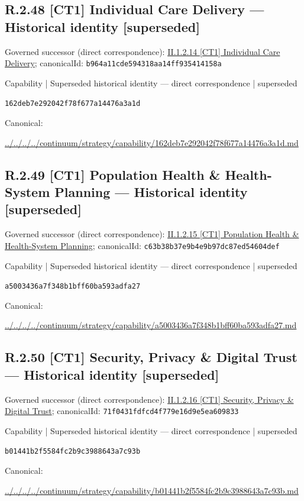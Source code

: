 \documentclass[10pt,a4paper]{article}
\begin{document}
\subsection*{R.2.48 [CT1] Individual Care Delivery — Historical identity [superseded]}
Governed successor (direct correspondence): \hyperref[element-b964a11cde594318aa14ff935414158a]{II.1.2.14 [CT1] Individual Care Delivery}; canonicalId: \texttt{b964a11cde594318aa14ff935414158a}\par
\label{element-162deb7e292042f78f677a14476a3a1d}
{\small Capability | Superseded historical identity — direct correspondence | superseded}\par
\texttt{162deb7e292042f78f677a14476a3a1d}\par
Canonical: \par
{\footnotesize\url{../../../../continuum/strategy/capability/162deb7e292042f78f677a14476a3a1d.md}}\par
\subsection*{R.2.49 [CT1] Population Health \& Health-System Planning — Historical identity [superseded]}
Governed successor (direct correspondence): \hyperref[element-c63b38b37e9b4e9b97dc87ed54604def]{II.1.2.15 [CT1] Population Health \& Health-System Planning}; canonicalId: \texttt{c63b38b37e9b4e9b97dc87ed54604def}\par
\label{element-a5003436a7f348b1bff60ba593adfa27}
{\small Capability | Superseded historical identity — direct correspondence | superseded}\par
\texttt{a5003436a7f348b1bff60ba593adfa27}\par
Canonical: \par
{\footnotesize\url{../../../../continuum/strategy/capability/a5003436a7f348b1bff60ba593adfa27.md}}\par
\subsection*{R.2.50 [CT1] Security, Privacy \& Digital Trust — Historical identity [superseded]}
Governed successor (direct correspondence): \hyperref[element-71f0431fdfcd4f779e16d9e5ea609833]{II.1.2.16 [CT1] Security, Privacy \& Digital Trust}; canonicalId: \texttt{71f0431fdfcd4f779e16d9e5ea609833}\par
\label{element-b01441b2f5584fc2b9c3988643a7c93b}
{\small Capability | Superseded historical identity — direct correspondence | superseded}\par
\texttt{b01441b2f5584fc2b9c3988643a7c93b}\par
Canonical: \par
{\footnotesize\url{../../../../continuum/strategy/capability/b01441b2f5584fc2b9c3988643a7c93b.md}}\par
\end{document}

